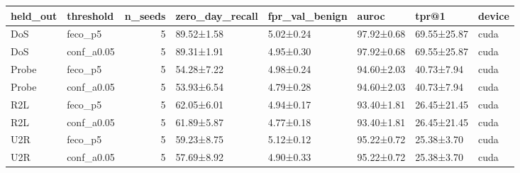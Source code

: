 \begin{tabular}{llrlllll}
\toprule
held\_out & threshold & n\_seeds & zero\_day\_recall & fpr\_val\_benign & auroc & tpr@1 & device \\
\midrule
DoS & feco\_p5 & 5 & 89.52±1.58 & 5.02±0.24 & 97.92±0.68 & 69.55±25.87 & cuda \\
DoS & conf\_a0.05 & 5 & 89.31±1.91 & 4.95±0.30 & 97.92±0.68 & 69.55±25.87 & cuda \\
Probe & feco\_p5 & 5 & 54.28±7.22 & 4.98±0.24 & 94.60±2.03 & 40.73±7.94 & cuda \\
Probe & conf\_a0.05 & 5 & 53.93±6.54 & 4.79±0.28 & 94.60±2.03 & 40.73±7.94 & cuda \\
R2L & feco\_p5 & 5 & 62.05±6.01 & 4.94±0.17 & 93.40±1.81 & 26.45±21.45 & cuda \\
R2L & conf\_a0.05 & 5 & 61.89±5.87 & 4.77±0.18 & 93.40±1.81 & 26.45±21.45 & cuda \\
U2R & feco\_p5 & 5 & 59.23±8.75 & 5.12±0.12 & 95.22±0.72 & 25.38±3.70 & cuda \\
U2R & conf\_a0.05 & 5 & 57.69±8.92 & 4.90±0.33 & 95.22±0.72 & 25.38±3.70 & cuda \\
\bottomrule
\end{tabular}
